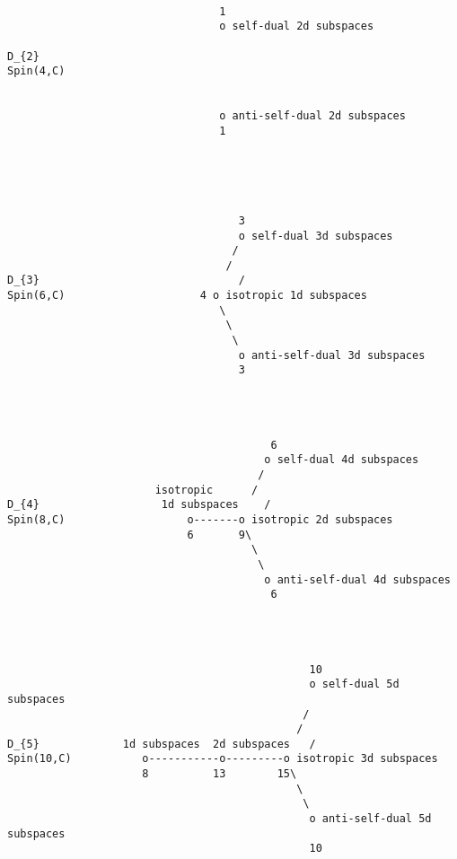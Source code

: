                                 

\begin{verbatim}

                                 1
                                 o self-dual 2d subspaces
                                 
D_{2}                                      
Spin(4,C)                 
                 
                                    
                                 o anti-self-dual 2d subspaces
                                 1
                               




                                    3
                                    o self-dual 3d subspaces
                                   /
                                  /
D_{3}                               /
Spin(6,C)                     4 o isotropic 1d subspaces
                                 \
                                  \
                                   \
                                    o anti-self-dual 3d subspaces
                                    3




                                         6
                                        o self-dual 4d subspaces
                                       /
                       isotropic      /
D_{4}                   1d subspaces    /
Spin(8,C)                   o-------o isotropic 2d subspaces 
                            6       9\
                                      \
                                       \
                                        o anti-self-dual 4d subspaces
                                         6




                                               10
                                               o self-dual 5d subspaces
                                              /            
                                             / 
D_{5}             1d subspaces  2d subspaces   /
Spin(10,C)           o-----------o---------o isotropic 3d subspaces
                     8          13        15\
                                             \
                                              \
                                               o anti-self-dual 5d subspaces
                                               10

\end{verbatim}
    
